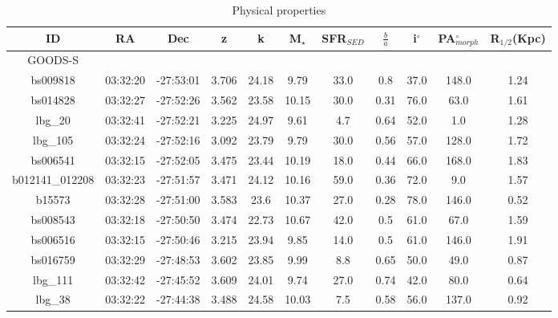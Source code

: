 \documentclass[fleqn,usenatbib]{mn2e}
\begin{document}
\begin{table*}
\centering
\begin{threeparttable}
\caption{Physical properties}
\label{tab:phys-props}
\begin{tabular}{ccccccccccc}


 \hline
ID              & RA       & Dec       & z     & k     & M$_{\star}$ & SFR$_{SED}$ & $\frac{b}{a}$ & i$^{\circ}$ & PA$_{morph}^{\circ}$ & R$_{1/2}$(Kpc) \\
 \hline
 GOODS-S & & & & & & & & & & \\
 \hline
bs009818        & 03:32:20 & -27:53:01 & 3.706        & 24.18  & 9.79  & 33.0 & 0.8         & 37.0        & 148.0   & 1.24      \\
bs014828        & 03:32:27 & -27:52:26 & 3.562        & 23.58  & 10.15 & 30.0 & 0.31        & 76.0        & 63.0    & 1.61      \\
lbg\_20         & 03:32:41 & -27:52:21 & 3.225        & 24.97  & 9.61  & 4.7  & 0.64        & 52.0        & 1.0     & 1.28      \\
lbg\_105        & 03:32:24 & -27:52:16 & 3.092      & 23.79  & 9.79  & 30.0 & 0.56        & 57.0        & 128.0   & 1.72      \\
bs006541        & 03:32:15 & -27:52:05 & 3.475       & 23.44  & 10.19 & 18.0 & 0.44        & 66.0        & 168.0   & 1.83      \\
b012141\_012208 & 03:32:23 & -27:51:57 & 3.471        & 24.12  & 10.16 & 59.0 & 0.36        & 72.0        & 9.0     & 1.57      \\
b15573          & 03:32:28 & -27:51:00 & 3.583        & 23.6   & 10.37 & 27.0 & 0.28        & 78.0        & 146.0   & 0.52      \\
bs008543        & 03:32:18 & -27:50:50 & 3.474        & 22.73  & 10.67 & 42.0 & 0.5         & 61.0        & 67.0    & 1.59      \\
bs006516        & 03:32:15 & -27:50:46 & 3.215        & 23.94  & 9.85  & 14.0 & 0.5         & 61.0        & 146.0   & 1.91      \\
bs016759        & 03:32:29 & -27:48:53 & 3.602       & 23.85  & 9.99  & 8.8  & 0.65        & 50.0        & 49.0    & 0.87      \\
lbg\_111        & 03:32:42 & -27:45:52 & 3.609       & 24.01  & 9.74  & 27.0 & 0.74        & 42.0        & 80.0    & 0.64      \\
lbg\_38         & 03:32:22 & -27:44:38 & 3.488       & 24.58  & 10.03 & 7.5  & 0.58        & 56.0        & 137.0   & 0.92      \\

\end{tabular}
\end{threeparttable}
\end{table*}
\end{document}
